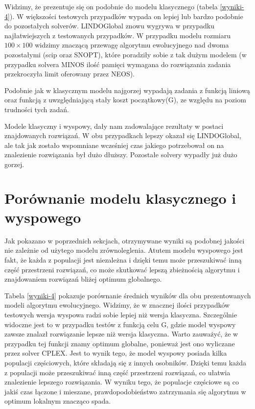 Widzimy, że prezentuje się on podobnie do modelu klasycznego (tabela \ref{wyniki-4}). W większości testowych przypadków wypada on lepiej lub bardzo 
podobnie do pozostałych solverów. LINDOGlobal znowu wygrywa w przypadku najłatwiejszych z testowanych przypadków. W przypadku modelu rozmiaru 
$100 \times 100$ widzimy znaczącą przewagę algorytmu ewolucyjnego nad dwoma pozostałymi (scip oraz SNOPT), które poradziły sobie z tak dużym 
modelem (w przypadku solvera MINOS ilość pamięci wymagana do rozwiązania zadania przekroczyła limit oferowany przez NEOS).

Podobnie jak w klasycznym modelu najgorzej wypadają zadania z funkcją liniową oraz funkcją z uwzględniającą stały koszt początkowy(G), ze względu 
na poziom trudności tych zadań. 

Modele klasyczny i wyspowy, dały nam zadowalające rezultaty w postaci znajdowanych rozwiązań. W obu przypadkach lepszy okazał się LINDOGlobal, ale tak 
jak zostało wspomniane wcześniej czas jakiego potrzebował on na znalezienie rozwiązania był dużo dłuższy. Pozostałe solvery wypadły już dużo gorzej.

\section{Porównanie modelu klasycznego i wyspowego}

Jak pokazano w poprzednich sekcjach, otrzymywane wyniki są podobnej jakości nie zależnie od użytego modelu zrównoleglenia. Atutem modelu wyspowego 
jest fakt, że każda z populacji jest niezależna i dzięki temu może przeszukiwać inną część przestrzeni rozwiązań\cite{ISLAND-MODEL-PERFORMANCE}, 
co może skutkować lepszą zbieżnością algorytmu i znajdowaniem rozwiązań bliżej optimum globalnego.


Tabela \ref{wyniki-4} pokazuje porównanie średnich wyników dla obu prezentowanych modeli algorytmu ewolucyjnego. Widzimy, że w znacznej ilości 
przypadków testowych wersja wyspowa radzi sobie lepiej niż wersja klasyczna. Szczególnie widoczne jest to w przypadku testów z funkcją celu G, 
gdzie model wyspowy zawsze znalazł rozwiązanie lepsze niż wersja klasyczna. Warto zauważyć, że w przypadku tej funkcji znamy optimum globalne, 
ponieważ jest ono wyliczane przez solver CPLEX. Jest to wynik tego, że model wyspowy posiada kilka populacji częściowych, które składają się 
z innych osobników. Dzięki temu każda z populacji może przeszukiwać inną część przestrzeni rozwiązań, co ułatwia znalezienie lepszego rozwiązania. 
W wyniku tego, że populacje częściowe są co jakiś czas łączone i mieszane, prawdopodobieństwo zatrzymania się algorytmu w optimum lokalnym 
znacząco spada. 

